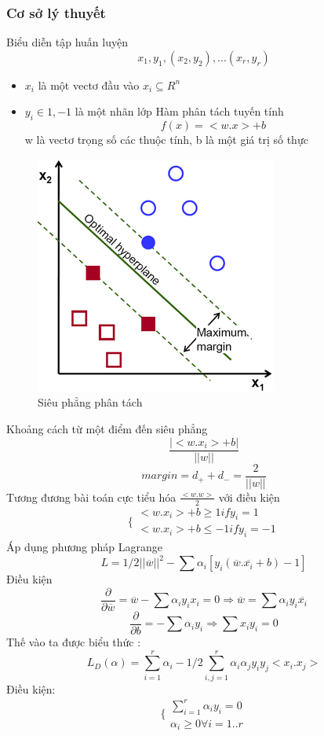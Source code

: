 \documentclass[a4paper,12pt]{report}
\begin{document}
\subsubsection{Cơ sở lý thuyết}
Biểu diễn tập huấn luyện 
$${x_1, y_1}, (x_2,y_2),...(x_r,y_r)$$
\begin{itemize}
\item $x_i$ là một vectơ đầu vào $x_i \subseteq R^n$
\item $y_i\in{1,-1}$ là một nhãn lớp
Hàm phân tách tuyến tính 
$$f(x)=<w.x> +b$$
w là vectơ trọng số các thuộc tính, b là một giá trị số thực\\


\end{itemize}
\begin{figure}[H]
\centering
\includegraphics[scale=3.0]{margin-svm.png}
\caption{Siêu phẳng phân tách}
\label{fig:margin-svm}
\end{figure}
Khoảng cách từ một điểm đến siêu phẳng 
$$\frac{|<w.x_i>+b|}{||w||} $$
$$margin=d_+ +d_-=\frac{2}{||w||}$$ 
Tương đương bài toán cực tiểu hóa $\frac{<w.w>}{2}$ với điều kiện 
$$ \lbrace\begin{array}{l}
 <w.x_i>+b \geq 1 if y_i=1\\ <w.x_i>+b
    \leq -1  if y_i=-1 \end{array} $$
Áp dụng phương pháp Lagrange  
$$ L= 1/2 ||\overline{w}||^2 -\sum\alpha_i[y_i(\overline{w}.\overline{x_i} +b)-1] $$
Điều kiện 
$$ \frac{ \partial}{\partial\overline{w}}
=\overline{w}- \sum \alpha_i y_i x_i=0 \Longrightarrow \overline{w}=\sum \alpha_i y_i \overline{x_i} $$
$$\frac{ \partial}{\partial b}=-\sum \alpha_i y_i \Longrightarrow \sum x_i y_i=0$$ 
Thế vào ta được biểu thức :
$$L_D(\alpha)=\sum_{i=1}^r \alpha_i-1/2 \sum_{i,j=1}^{r}\alpha_i \alpha_j y_i y_j<x_i.x_j> $$
Điều kiện:
$$\{ \begin{array}{l}
\sum_{i=1 } ^{r} \alpha_i y_i =0 \\
\alpha_i \geq 0 \forall i=1..r
\end{array}
$$
\end{document}
